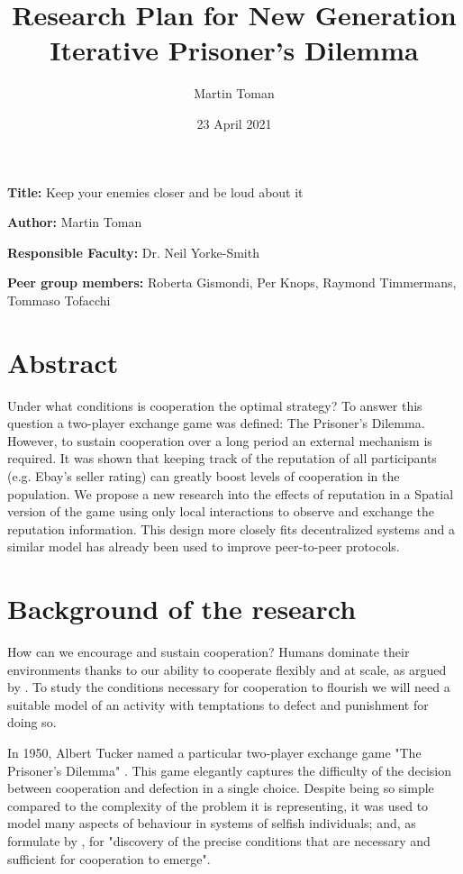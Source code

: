 \documentclass[english]{article}
\title{Research Plan for New Generation Iterative Prisoner's Dilemma}
\author{Martin Toman}
\date{23 April 2021}
\newcommand{\namelistlabel}[1]{\mbox{#1}\hfil}
\newenvironment{namelist}[1]{%
\begin{list}{}{
  \let\makelabel\namelistlabel
  \settowidth{\labelwidth}{#1}
  \setlength{\leftmargin}{1.1\labelwidth}
}}{%
\end{list}}
\begin{document}

\maketitle
\begin{namelist}{}
\item[{\bf Title:}]
  Keep your enemies closer and be loud about it
\item[{\bf Author:}]
  Martin Toman
\item[{\bf Responsible Faculty:}]
  Dr. Neil Yorke-Smith
\item[{\bf Peer group members:}]
  Roberta Gismondi,
  Per Knops,
  Raymond Timmermans,
  Tommaso Tofacchi
\end{namelist}



\section*{Abstract}
Under what conditions is cooperation the optimal strategy?
To answer this question a two-player exchange game was defined: The Prisoner’s Dilemma.
However, to sustain cooperation over a long period an external mechanism is required.
It was shown that keeping track of the reputation of all participants (e.g. Ebay's seller rating) can greatly boost levels of cooperation in the population.
We propose a new research into the effects of reputation in a Spatial version of the game using only local interactions to observe and exchange the reputation information. This design more closely fits decentralized systems and a similar model has already been used to improve peer-to-peer protocols.



\section*{Background of the research}

How can we encourage and sustain cooperation? Humans dominate their environments thanks to our ability to cooperate flexibly and at scale, as argued by \citet{harari-sapiens}.
To study the conditions necessary for cooperation to flourish we will need a suitable model of an activity with temptations to defect and punishment for doing so.

In 1950, Albert Tucker named a particular two-player exchange game "The Prisoner's Dilemma" \citep{sep-prisoner-dilemma}.
This game elegantly captures the difficulty of the decision between cooperation and defection in a single choice.
Despite being so simple compared to the complexity of the problem it is representing, it was used to model many aspects of behaviour in systems of selfish individuals; and, as formulate by \citet{Axelrod84}, for "discovery of the precise conditions that are necessary and sufficient for cooperation to emerge".
\end{document}
